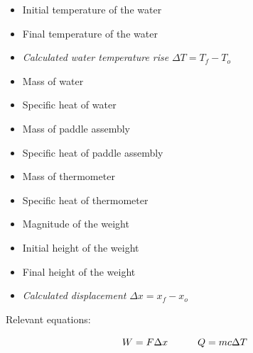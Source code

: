 \begin{itemize}
\item{} Initial temperature of the water
\item{} Final temperature of the water 
\item{} {\it Calculated water temperature rise} $\Delta T = T_f - T_o$
\vskip 5pt
\item{} Mass of water 
\item{} Specific heat of water 
\item{} Mass of paddle assembly
\item{} Specific heat of paddle assembly
\item{} Mass of thermometer
\item{} Specific heat of thermometer
\vskip 5pt
\item{} Magnitude of the weight
\item{} Initial height of the weight
\item{} Final height of the weight
\item{} {\it Calculated displacement} $\Delta x = x_f - x_o$
\end{itemize}

Relevant equations:

$$W = F \Delta x  \hskip 30pt  Q = mc \Delta T$$












